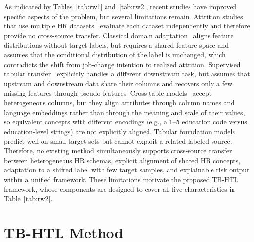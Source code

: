 \documentclass[runningheads]{llncs}
\begin{document}
As indicated by Tables~\ref{tab:rw1} and~\ref{tab:rw2}, recent studies have improved specific aspects of the problem, but several limitations remain. Attrition studies that use multiple HR datasets~\cite{baydili2025,alali2026} evaluate each dataset independently and therefore provide no cross-source transfer. Classical domain adaptation~\cite{ganin2015,sun2016} aligns feature distributions without target labels, but requires a shared feature space and assumes that the conditional distribution of the label is unchanged, which contradicts the shift from job-change intention to realized attrition. Supervised tabular transfer~\cite{levin2023} explicitly handles a different downstream task, but assumes that upstream and downstream data share their columns and recovers only a few missing features through pseudo-features. Cross-table models~\cite{wang2022,kim2024} accept heterogeneous columns, but they align attributes through column names and language embeddings rather than through the meaning and scale of their values, so equivalent concepts with different encodings (e.g., a 1--5 education code versus education-level strings) are not explicitly aligned. Tabular foundation models~\cite{hollmann2025} predict well on small target sets but cannot exploit a related labeled source. Therefore, no existing method simultaneously supports cross-source transfer between heterogeneous HR schemas, explicit alignment of shared HR concepts, adaptation to a shifted label with few target samples, and explainable risk output within a unified framework. These limitations motivate the proposed TB-HTL framework, whose components are designed to cover all five characteristics in Table~\ref{tab:rw2}.

\section{TB-HTL Method}\label{sec:method}
\end{document}
